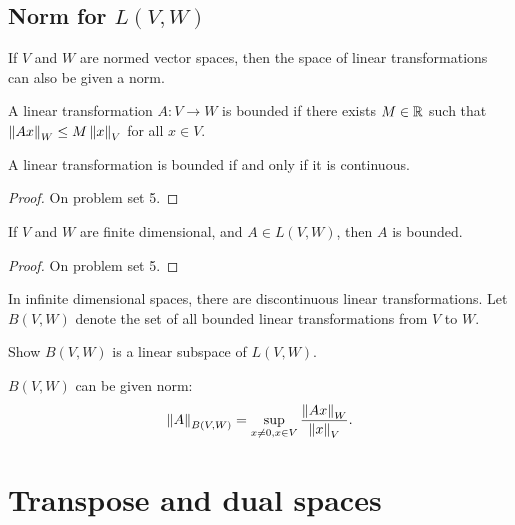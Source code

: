 \subsection{Norm for $L(V,W)$}

If $V$ and $W$ are normed vector spaces, then the space of linear
transformations can also be given a norm.
\begin{definition}
  A linear transformation $A:V \to W$ is bounded if there exists $M
  \in \mathbb{R}$ such that $\left\Vert {Ax} \right\Vert_W \leq M \left\Vert {x} \right\Vert_V$ for all $x \in V$.
\end{definition}
\begin{lemma}
  A linear transformation is bounded if and only if it is continuous. 
\end{lemma}
\begin{proof}
  On problem set 5.
\end{proof}
\begin{lemma}
  If $V$ and $W$ are finite dimensional, and $A \in L(V,W)$, then $A$
  is bounded.
\end{lemma}
\begin{proof}
  On problem set 5.
\end{proof}
In infinite dimensional spaces, there are discontinuous linear
transformations. Let $B(V,W)$ denote the set of all bounded linear
transformations from $V$ to $W$. 
\begin{exercise}
  Show $B(V,W)$ is a linear subspace of $L(V,W)$.
\end{exercise}
$B(V,W)$ can be given norm: 
\[ \left\Vert {A} \right\Vert_{B(V,W)} = \sup_{x \neq 0, x\in V}
\frac{\left\Vert {Ax} \right\Vert_{W}}{\left\Vert {x} \right\Vert_V}. \]

\section{Transpose and dual spaces}

